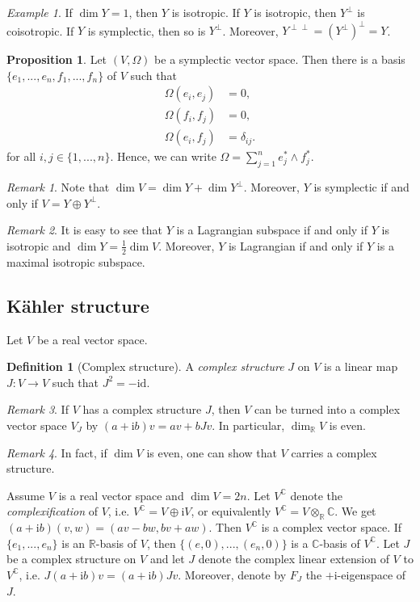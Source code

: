 \documentclass[11pt]{amsart}
\numberwithin{equation}{section}
\theoremstyle{plain}
\theoremstyle{definition}
\newtheorem{defn}{Definition}[subsection]
\newtheorem{prop}{Proposition}[subsection]
\theoremstyle{remark}
\newtheorem{rem}{Remark}[subsection]
\newtheorem{ex}{Example}[subsection]
\newcommand{\R}{\mathbb{R}}
\newcommand{\id}{\mathrm{id}}
\newcommand{\I}{\mathrm{i}}
\begin{document}
\begin{ex}
If $\dim Y=1$, then $Y$ is isotropic. If $Y$ is isotropic, then $Y^\perp$ is coisotropic. If $Y$ is symplectic, then so is $Y^\perp$. Moreover, $Y^{\perp\perp}=(Y^\perp)^\perp=Y$.
\end{ex}

\begin{prop}
Let $(V,\Omega)$ be a symplectic vector space. Then there is a basis $\{e_1,...,e_n,f_1,...,f_n\}$ of $V$ such that 
\begin{align*}
\Omega(e_i,e_j)&=0,\\
\Omega(f_i,f_j)&=0,\\
\Omega(e_i,f_j)&=\delta_{ij}.
\end{align*}
for all $i,j\in\{1,...,n\}$. Hence, we can write $\Omega=\sum_{j=1}^ne_j^*\land f_j^*$.
\end{prop}

\begin{rem}
Note that $\dim V=\dim Y+\dim Y^\perp$. Moreover, $Y$ is symplectic if and only if $V=Y\oplus Y^\perp$.
\end{rem}

\begin{rem}
It is easy to see that $Y$ is a Lagrangian subspace if and only if $Y$ is isotropic and $\dim Y=\frac{1}{2}\dim V$. Moreover, $Y$ is Lagrangian if and only if $Y$ is a maximal isotropic subspace.
\end{rem}

\subsection{K\"ahler structure}

Let $V$ be a real vector space.

\begin{defn}[Complex structure]
A \emph{complex structure} $J$ on $V$ is a linear map $J\colon V\to V$ such that $J^2=-\id$. 
\end{defn}
\begin{rem}
If $V$ has a complex structure $J$, then $V$ can be turned into a complex vector space $V_J$ by $(a+\I b)v=av+bJv$. In particular, $\dim_\R V$ is even.
\end{rem}

\begin{rem}
In fact, if $\dim V$ is even, one can show that $V$ carries a complex structure.
\end{rem}

Assume $V$ is a real vector space and $\dim V=2n$. Let $V^\mathbb{C}$ denote the \emph{complexification} of $V$, i.e. $V^\mathbb{C}=V\oplus \I V$, or equivalently $V^\mathbb{C}=V\otimes_\R \mathbb{C}$. We get $(a+\I b)(v,w)=(av-bw,bv+aw)$. Then $V^\mathbb{C}$ is a complex vector space. If $\{e_1,...,e_n\}$ is an $\R$-basis of $V$, then $\{(e,0),...,(e_n,0)\}$ is a $\mathbb{C}$-basis of $V^\mathbb{C}$. Let $J$ be a complex structure on $V$ and let $J$ denote the complex linear extension of $V$ to $V^\mathbb{C}$, i.e. $J(a+\I b)v=(a+\I b)Jv$. Moreover, denote by $F_J$ the $+\I$-eigenspace of $J$.
\end{document}
